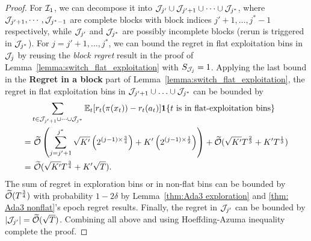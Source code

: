 \begin{proof}
For ${\mathcal{I}}_1$, we can decompose it into ${\mathcal{J}}_{j'} \cup {\mathcal{J}}_{j'+1} \cup \cdots \cup {\mathcal{J}}_{j^*}$, where ${\mathcal{J}}_{j'+1}, \cdots,  {\mathcal{J}}_{j^*-1}$ are complete blocks with block indices $j'+1, \ldots, j^*-1$ respectively, while ${\mathcal{J}}_{j'}$ and ${\mathcal{J}}_{j^*}$ are possibly incomplete blocks (rerun is triggered in ${\mathcal{J}}_{j^*}$). For $j=j'+1, \ldots, j^*$, we can bound the regret in flat exploitation bins in ${\mathcal{J}}_j$ by reusing the \textit{block regret} result in the proof of Lemma~\ref{lemma:switch_flat_exploitation} with $S_{{\mathcal{J}}_j}=1$. Applying the last bound in the \textbf{Regret in a block} part of Lemma~\ref{lemma:switch_flat_exploitation}, the regret in flat exploitation bins in ${\mathcal{J}}_{j'+1} \cup \ldots \cup {\mathcal{J}}_{j^*}$ can be bounded by
\begin{align*}
    &\sum_{t\in {\mathcal{J}}_{j'+1}\cup\cdots\cup{\mathcal{J}}_{j^*}} \mathbb{E}_t[r_t(\pi(x_t))-r_t(a_t)]\boldsymbol{1}\{t \text{ is in flat-exploitation bins}\}\\
    =&~\widetilde{\mathcal{O}}\left(\sum_{j=j'+1}^{j^*}\sqrt{K^\prime}\left(2^{(j-1)\times\frac{3}{4}}\right) +K^\prime\left(2^{(j-1)\times\frac{1}{2}}\right) \right) + \widetilde{\mathcal{O}}(\sqrt{K'}T^{\frac{2}{3}} + K'T^{\frac{1}{3}})\\
    =&~\widetilde{\mathcal{O}}(\sqrt{K'}T^{\frac{3}{4}} + K'\sqrt{T}).
\end{align*}
The sum of regret in exploration bins or in non-flat bins can be bounded by $\widetilde{\mathcal{O}}(T^{\frac{3}{4}})$ with probability $1-2\delta$ by Lemma~\ref{thm:Ada3 exploration} and \ref{thm: Ada3 nonflat}'s epoch regret results. Finally, the regret in ${\mathcal{J}}_{j'}$ can be bounded by $|{\mathcal{J}}_{j'}|=\widetilde{\mathcal{O}}(\sqrt{T})$. Combining all above and using Hoeffding-Azuma inequality complete the proof. 
\end{proof}